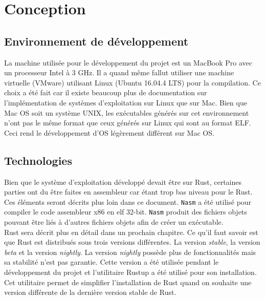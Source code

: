 \documentclass[a4paper]{article}
\begin{document}

\section{Conception}
\subsection{Environnement de développement}
La machine utilisée pour le développement du projet est un MacBook Pro avec un
processeur Intel à 3 GHz. Il a quand même fallut utiliser une machine virtuelle
(VMware) utilisant Linux (Ubuntu 16.04.4 LTS) pour la compilation. Ce choix a été
fait car il existe beaucoup plus de documentation sur l'implémentation de systèmes
d'exploitation sur Linux que sur Mac. Bien que Mac OS soit un système UNIX, les
exécutables générés sur cet environnement n'ont pas le même format que ceux générés
sur Linux qui sont au format ELF. Ceci rend le développement d'OS légèrement
différent sur Mac OS.


\subsection{Technologies}
Bien que le système d'exploitation développé devait être sur Rust, certaines parties
ont du être faites en assembleur car étant trop bas niveau pour le Rust. Ces éléments
seront décrits plus loin dans ce document. \texttt{Nasm} a été  utilisé 
pour compiler le code assembleur x86 en elf 32-bit. \texttt{Nasm}
produit des fichiers objets pouvant être liés à d'autres fichiers objets afin de
créer un exécutable. \\

Rust sera décrit plus en détail dans un prochain chapitre. Ce qu'il faut savoir
est que Rust est distribués sous trois versions différentes. La version \textit{stable},
la version \textit{beta} et la version \textit{nightly}. La version \textit{nightly}
possède plus de fonctionnalités mais sa stabilité n'est pas garantie. Cette version
a été utilisée pendant le développement du projet et l'utilitaire Rustup a été utilisé
pour son installation. Cet utilitaire permet de simplifier l'installation de Rust
quand on souhaite une version différente de la dernière version stable de Rust. \\
\end{document}
